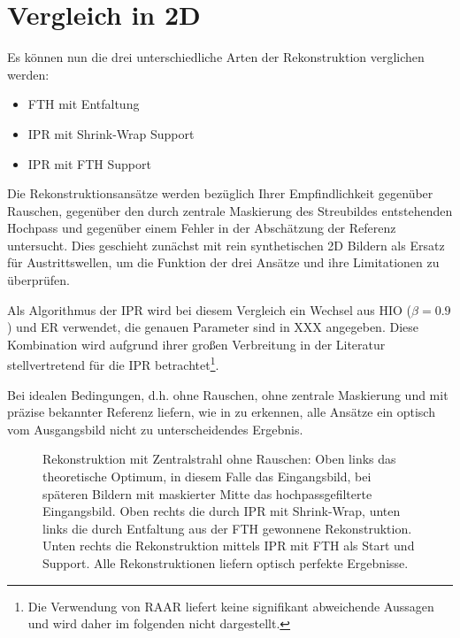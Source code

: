 \section{Vergleich in 2D}	
Es können nun die drei unterschiedliche Arten der Rekonstruktion verglichen werden:
\begin{itemize}
	\item FTH mit Entfaltung
	\item IPR mit Shrink-Wrap Support
	\item IPR mit FTH Support
\end{itemize}
Die Rekonstruktionsansätze werden bezüglich Ihrer Empfindlichkeit gegenüber Rauschen, gegenüber den durch zentrale Maskierung des Streubildes entstehenden Hochpass und gegenüber einem Fehler in der Abschätzung der Referenz untersucht. Dies geschieht zunächst mit rein synthetischen 2D Bildern als Ersatz für Austrittswellen, um die Funktion der drei Ansätze und ihre Limitationen zu überprüfen.

Als Algorithmus der IPR wird bei diesem Vergleich ein Wechsel aus HIO ($\beta=0.9$) und ER verwendet, die genauen Parameter sind in XXX angegeben. Diese Kombination wird aufgrund ihrer großen Verbreitung in der Literatur stellvertretend für die IPR betrachtet\footnote{Die Verwendung von RAAR liefert keine signifikant abweichende Aussagen und wird daher im folgenden nicht dargestellt.}. 

Bei idealen Bedingungen, d.h. ohne Rauschen, ohne zentrale Maskierung und mit präzise bekannter Referenz liefern, wie in  zu erkennen, alle Ansätze ein optisch vom Ausgangsbild nicht zu unterscheidendes Ergebnis.

\begin{figure}
	\centering
	\caption[2D Rekonstruktion: Ideal]{Rekonstruktion mit Zentralstrahl ohne Rauschen: Oben links das theoretische Optimum, in diesem Falle das Eingangsbild, bei späteren Bildern mit maskierter Mitte das hochpassgefilterte Eingangsbild. Oben rechts die durch IPR mit Shrink-Wrap, unten links die durch Entfaltung aus der FTH gewonnene Rekonstruktion. Unten rechts die Rekonstruktion mittels IPR mit FTH als Start und Support. Alle Rekonstruktionen liefern optisch perfekte Ergebnisse.}
	\label{fig:recon2d-perfect}
\end{figure}

